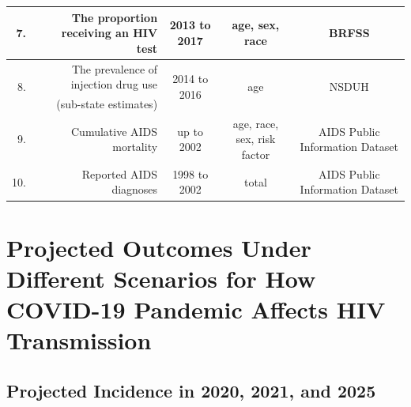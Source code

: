 \documentclass{article}
\begin{document}
\begin{table}[H]
\begin{tabular}{r r c c c}
		7. & The proportion receiving an HIV test & 2013 to 2017 & age, sex, race & BRFSS \cite{brfss.13.17} \\
		\hline
		
		\multirow{2}{*}{8.} & The prevalence of injection drug use & \multirow{2}{*}{2014 to 2016} & \multirow{2}{*}{age} & \multirow{2}{*}{NSDUH \cite{nsduh} }\\
		& (sub-state estimates) & & & \\
		\hline
		
		9. & Cumulative AIDS mortality & up to 2002 & age, race, sex, risk factor & AIDS Public Information Dataset\cite{apids} \\
		\hline
		
		10. & Reported AIDS diagnoses & 1998 to 2002 & total &  AIDS Public Information Dataset\cite{apids} \\
		\hline		
	\end{tabular}
\end{table}



\section{Projected Outcomes Under Different Scenarios for How COVID-19 Pandemic Affects HIV Transmission}



\subsection{Projected Incidence in 2020, 2021, and 2025}
\end{document}
